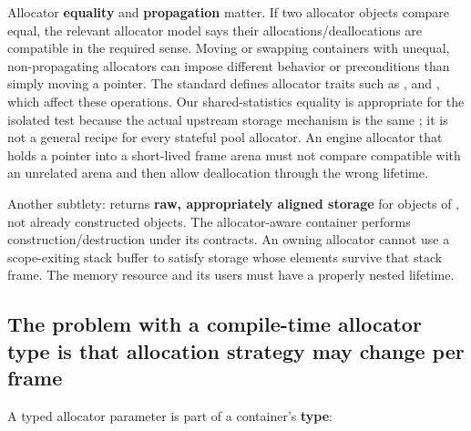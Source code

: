 Allocator \textbf{equality} and \textbf{propagation} matter. If two allocator objects compare equal, the relevant allocator model says their allocations/deallocations are compatible in the required sense. Moving or swapping containers with unequal, non-propagating allocators can impose different behavior or preconditions than simply moving a pointer. The standard defines allocator traits such as ,  and , which affect these operations. Our shared-statistics equality is appropriate for the isolated test because the actual upstream storage mechanism is the same ; it is not a general recipe for every stateful pool allocator. An engine allocator that holds a pointer into a short-lived frame arena must not compare compatible with an unrelated arena and then allow deallocation through the wrong lifetime.

Another subtlety:  returns \textbf{raw, appropriately aligned storage} for  objects of , not  already constructed objects. The allocator-aware container performs construction/destruction under its contracts. An owning allocator cannot use a scope-exiting stack buffer to satisfy storage whose elements survive that stack frame. The memory resource and its users must have a properly nested lifetime.

\subsection{The problem with a compile-time allocator type is that allocation strategy may change per frame}\label{01-foundations-i-ch006-the-problem-with-a-compile-time-allocator-type-is-that-allocation-strategy-may-change-per-frame}

\hypertarget{01-foundations-i-ch006-the-problem-with-a-compile-time-allocator-type-is-that-allocation-strategy-may-change-per-frame}{}

A typed allocator parameter is part of a container's \textbf{type}:

